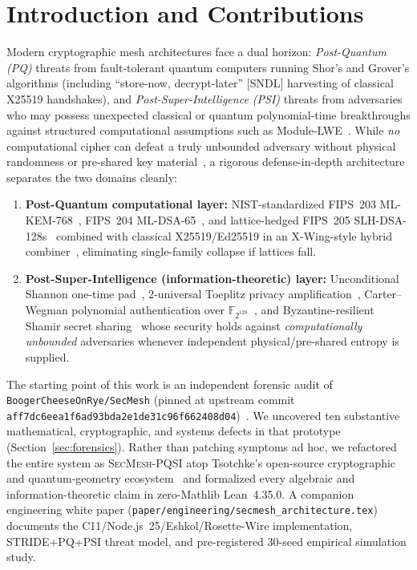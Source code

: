 \documentclass[11pt,reqno]{amsart}
\theoremstyle{definition}
\newcommand{\F}{\mathbb{F}}
\newcommand{\code}[1]{\texttt{\small #1}}
\begin{document}
\maketitle

\section{Introduction and Contributions}
\label{sec:intro}

Modern cryptographic mesh architectures face a dual horizon: \emph{Post-Quantum (PQ)} threats from fault-tolerant quantum computers running Shor's and Grover's algorithms (including ``store-now, decrypt-later'' [SNDL] harvesting of classical X25519 handshakes), and \emph{Post-Super-Intelligence (PSI)} threats from adversaries who may possess unexpected classical or quantum polynomial-time breakthroughs against structured computational assumptions such as Module-LWE~\cite{regev2009,nist_fips203}.
While \emph{no} computational cipher can defeat a truly unbounded adversary without physical randomness or pre-shared key material~\cite{shannon1949}, a rigorous defense-in-depth architecture separates the two domains cleanly:
\begin{enumerate}[leftmargin=1.8em]
  \item \textbf{Post-Quantum computational layer:} NIST-standardized FIPS~203 ML-KEM-768~\cite{nist_fips203}, FIPS~204 ML-DSA-65~\cite{nist_fips204}, and lattice-hedged FIPS~205 SLH-DSA-128s~\cite{nist_fips205} combined with classical X25519/Ed25519 in an X-Wing-style hybrid combiner~\cite{barbosa2024xwing}, eliminating single-family collapse if lattices fall.
  \item \textbf{Post-Super-Intelligence (information-theoretic) layer:} Unconditional Shannon one-time pad~\cite{shannon1949}, $2$-universal Toeplitz privacy amplification~\cite{mansour1993,renner2008}, Carter--Wegman polynomial authentication over $\F_{2^{128}}$~\cite{wegman1981}, and Byzantine-resilient Shamir secret sharing~\cite{shamir1979} whose security holds against \emph{computationally unbounded} adversaries whenever independent physical/pre-shared entropy is supplied.
\end{enumerate}

The starting point of this work is an independent forensic audit of \code{BoogerCheeseOnRye/SecMesh} (pinned at upstream commit \code{aff7dc6eea1f6ad93bda2e1de31c96f662408d04})~\cite{secmesh_upstream}.
We uncovered ten substantive mathematical, cryptographic, and systems defects in that prototype (Section~\ref{sec:forensics}).
Rather than patching symptoms ad hoc, we refactored the entire system as \textsc{SecMesh-PQSI} atop Tsotchke's open-source cryptographic and quantum-geometry ecosystem~\cite{tsotchke_moonlab,tsotchke_qgtl,tsotchke_eshkol,tsotchke_pqcb} and formalized every algebraic and information-theoretic claim in zero-Mathlib Lean~4.35.0.
A companion engineering white paper (\code{paper/engineering/secmesh\_architecture.tex}) documents the C11/Node.js~25/Eshkol/Rosette-Wire implementation, STRIDE+PQ+PSI threat model, and pre-registered $30$-seed empirical simulation study.
\end{document}

